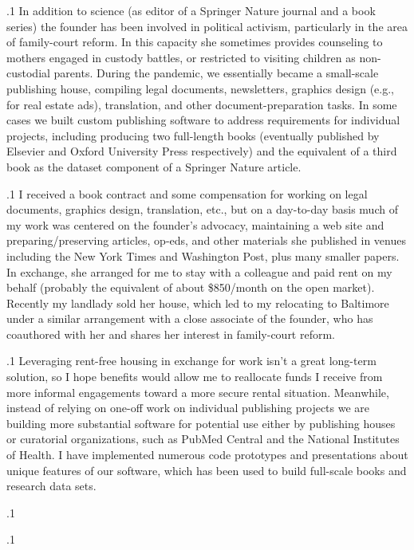 \documentclass[11pt, twoside]{article}
\begin{document}
{\p.1{%
In addition to science (as
editor of a Springer Nature journal and a book series) the founder
has been involved in political activism, particularly in the area
of family-court reform. In this capacity she sometimes provides
counseling to mothers engaged in custody battles, or restricted
to visiting children as non-custodial parents. During the pandemic, we essentially
became a small-scale publishing house, compiling legal documents,
newsletters, graphics design (e.g., for real estate ads), translation,
and other document-preparation tasks. In some cases we built custom
publishing software to address requirements for individual projects,
including producing two full-length books
(eventually published by Elsevier and Oxford University Press respectively)
and the equivalent of a third book as the dataset component of a
Springer Nature article.
}%

\p.1{%
I received a book contract and some compensation for working on legal documents,
graphics design, translation, etc., but on a day-to-day basis much of
my work was centered on the founder's advocacy, maintaining a web site
and preparing/preserving articles, op-eds, and other materials
she published in venues including the New York Times and Washington Post,
plus many smaller papers. In exchange, she arranged for me to stay with a
colleague and paid rent on my behalf (probably the equivalent of about
\$850/month on the open market). Recently my landlady sold her house,
which led to my relocating to Baltimore under a similar arrangement
with a close associate of the founder, who has coauthored with her and
shares her interest in family-court reform.
}%

\p.1{%
Leveraging rent-free housing in exchange for  work isn't a
great long-term solution, so I hope  benefits would allow me to
reallocate funds I receive from more informal  engagements toward
a more secure rental situation. Meanwhile, instead of relying on one-off
work on individual publishing projects we are building
more substantial software for potential use either by publishing
houses or curatorial organizations, such as PubMed Central and
the National Institutes of Health. I have
implemented numerous code prototypes and presentations about
unique features of our software, which has been used to
build full-scale books and research data sets.
}%

\p.1{%
\ghrule{}
}%

\p.1{%
\Supplement{}
}%

}
\end{document}
